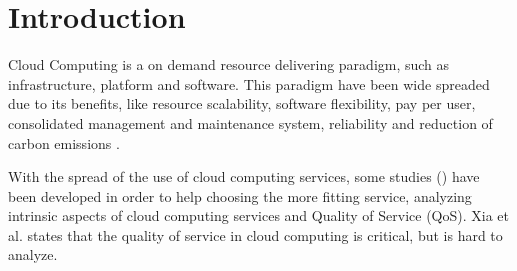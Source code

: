 \documentclass[conference]{IEEEtran}
\begin{document}




%
\IEEEpeerreviewmaketitle



\section{Introduction}


Cloud Computing is a on demand resource delivering paradigm, such as infrastructure, platform and software. This paradigm have been wide spreaded
due to its benefits, like resource scalability, software flexibility, pay per user, consolidated management and maintenance system, reliability 
and reduction of carbon emissions \cite{rehman2011teaching}.


With the spread of the use of cloud computing services, some studies (\cite{soltani2016, garg2011, li2012, 
bardsiri2014, lesun2016, quarati2016}) have been developed in order to help choosing the more fitting service, 
analyzing intrinsic aspects of cloud computing services and Quality of Service (QoS). Xia et al. \cite{xia2013} states that the 
quality of service in cloud computing is critical, but is hard to analyze.
\end{document}
